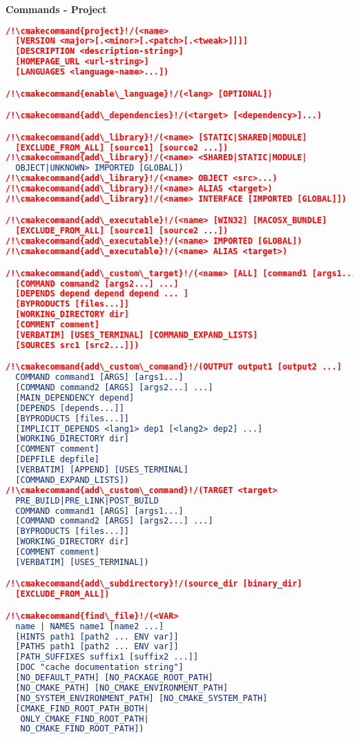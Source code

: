 \documentclass{article}
\newcommand{\cmakecommand}[1]{{\href{https://cmake.org/cmake/help/v3.13/command/#1.html}{#1}}}
\begin{document}
\begin{minipage}[t]{0.18\linewidth}
\textbf{Commands - Project}
\begin{lstlisting}[language=CMake]
/!\cmakecommand{project}!/(<name>
  [VERSION <major>[.<minor>[.<patch>[.<tweak>]]]]
  [DESCRIPTION <description-string>]
  [HOMEPAGE_URL <url-string>]
  [LANGUAGES <language-name>...])

/!\cmakecommand{enable\_language}!/(<lang> [OPTIONAL])

/!\cmakecommand{add\_dependencies}!/(<target> [<dependency>]...)

/!\cmakecommand{add\_library}!/(<name> [STATIC|SHARED|MODULE]
  [EXCLUDE_FROM_ALL] [source1] [source2 ...])
/!\cmakecommand{add\_library}!/(<name> <SHARED|STATIC|MODULE|
  OBJECT|UNKNOWN> IMPORTED [GLOBAL])
/!\cmakecommand{add\_library}!/(<name> OBJECT <src>...)
/!\cmakecommand{add\_library}!/(<name> ALIAS <target>)
/!\cmakecommand{add\_library}!/(<name> INTERFACE [IMPORTED [GLOBAL]])

/!\cmakecommand{add\_executable}!/(<name> [WIN32] [MACOSX_BUNDLE]
  [EXCLUDE_FROM_ALL] [source1] [source2 ...])
/!\cmakecommand{add\_executable}!/(<name> IMPORTED [GLOBAL])
/!\cmakecommand{add\_executable}!/(<name> ALIAS <target>)

/!\cmakecommand{add\_custom\_target}!/(<name> [ALL] [command1 [args1...]]
  [COMMAND command2 [args2...] ...]
  [DEPENDS depend depend depend ... ]
  [BYPRODUCTS [files...]]
  [WORKING_DIRECTORY dir]
  [COMMENT comment]
  [VERBATIM] [USES_TERMINAL] [COMMAND_EXPAND_LISTS]
  [SOURCES src1 [src2...]])

/!\cmakecommand{add\_custom\_command}!/(OUTPUT output1 [output2 ...]
  COMMAND command1 [ARGS] [args1...]
  [COMMAND command2 [ARGS] [args2...] ...]
  [MAIN_DEPENDENCY depend]
  [DEPENDS [depends...]]
  [BYPRODUCTS [files...]]
  [IMPLICIT_DEPENDS <lang1> dep1 [<lang2> dep2] ...]
  [WORKING_DIRECTORY dir]
  [COMMENT comment]
  [DEPFILE depfile]
  [VERBATIM] [APPEND] [USES_TERMINAL]
  [COMMAND_EXPAND_LISTS])
/!\cmakecommand{add\_custom\_command}!/(TARGET <target>
  PRE_BUILD|PRE_LINK|POST_BUILD
  COMMAND command1 [ARGS] [args1...]
  [COMMAND command2 [ARGS] [args2...] ...]
  [BYPRODUCTS [files...]]
  [WORKING_DIRECTORY dir]
  [COMMENT comment]
  [VERBATIM] [USES_TERMINAL])

/!\cmakecommand{add\_subdirectory}!/(source_dir [binary_dir]
  [EXCLUDE_FROM_ALL])

/!\cmakecommand{find\_file}!/(<VAR>
  name | NAMES name1 [name2 ...]
  [HINTS path1 [path2 ... ENV var]]
  [PATHS path1 [path2 ... ENV var]]
  [PATH_SUFFIXES suffix1 [suffix2 ...]]
  [DOC "cache documentation string"]
  [NO_DEFAULT_PATH] [NO_PACKAGE_ROOT_PATH]
  [NO_CMAKE_PATH] [NO_CMAKE_ENVIRONMENT_PATH]
  [NO_SYSTEM_ENVIRONMENT_PATH] [NO_CMAKE_SYSTEM_PATH]
  [CMAKE_FIND_ROOT_PATH_BOTH|
   ONLY_CMAKE_FIND_ROOT_PATH|
   NO_CMAKE_FIND_ROOT_PATH])


\end{lstlisting}
\end{minipage}
\end{document}
